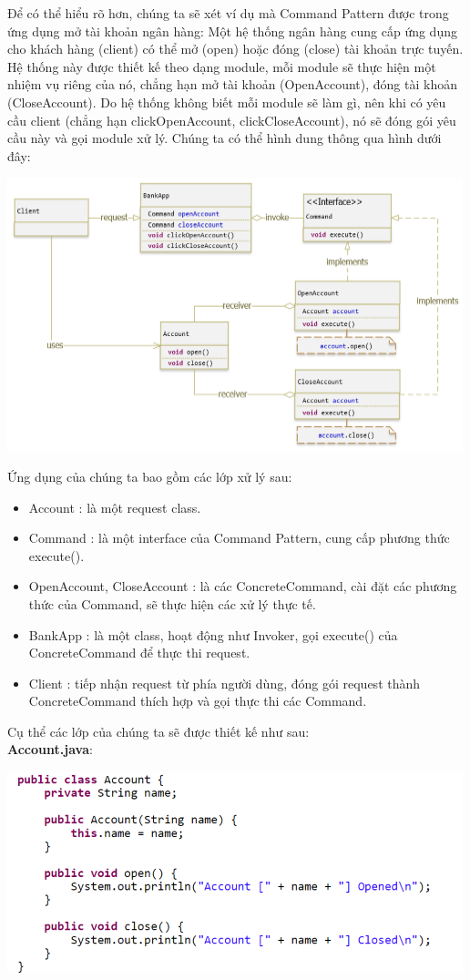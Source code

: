 Để có thể hiểu rõ hơn, chúng ta sẽ xét ví dụ mà Command Pattern được trong ứng dụng mở tài khoản ngân hàng: Một hệ thống ngân hàng cung cấp ứng dụng cho khách hàng (client) có thể mở (open) hoặc đóng (close) tài khoản trực tuyến. Hệ thống này được thiết kế theo dạng module, mỗi module sẽ thực hiện một nhiệm vụ riêng của nó, chẳng hạn mở tài khoản (OpenAccount), đóng tài khoản (CloseAccount). Do hệ thống không biết mỗi module sẽ làm gì, nên khi có yêu cầu client (chẳng hạn clickOpenAccount, clickCloseAccount), nó sẽ đóng gói yêu cầu này và gọi module xử lý. Chúng ta có thể hình dung thông qua hình dưới đây:
\begin{center}
\includegraphics{GALLEYS/images/chapter7/example}
\end{center}
Ứng dụng của chúng ta bao gồm các lớp xử lý sau:
\begin{itemize}
\item Account : là một request class.
\item Command : là một interface của Command Pattern, cung cấp phương thức execute().
\item OpenAccount, CloseAccount : là các ConcreteCommand, cài đặt các phương thức của Command, sẽ thực hiện các xử lý thực tế.
\item BankApp : là một class, hoạt động như Invoker, gọi execute() của ConcreteCommand để thực thi request.
\item Client : tiếp nhận request từ phía người dùng, đóng gói request thành ConcreteCommand thích hợp và gọi thực thi các Command.
\end{itemize}
Cụ thể các lớp của chúng ta sẽ được thiết kế như sau:\\
\textbf{Account.java}:
\begin{center}
\includegraphics{GALLEYS/images/chapter7/code1}
\end{center}
